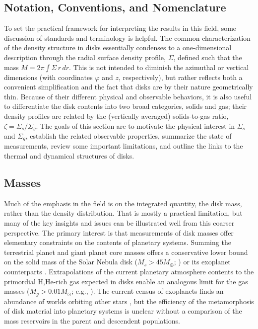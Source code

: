 \documentclass[a4paper]{ar-1col}
\begin{document}
\begin{textbox}[t]\section{Notation, Conventions, and Nomenclature}
To set the practical framework for interpreting the results in this field, some discussion of standards and terminology is helpful.  The common characterization of the density structure in disks essentially condenses to a one-dimensional description through the radial surface density profile, $\Sigma$, defined such that the mass $M = 2\pi \int \Sigma \, r \, dr$.  This is not intended to diminish the azimuthal or vertical dimensions (with coordinates $\varphi$ and $z$, respectively), but rather reflects both a convenient simplification and the fact that disks are by their nature geometrically thin.  Because of their different physical and observable behaviors, it is also useful to differentiate the disk contents into two broad categories, solids and gas; their density profiles are related by the (vertically averaged) solids-to-gas ratio, $\zeta = \Sigma_s / \Sigma_g$.  The goals of this section are to motivate the physical interest in $\Sigma_s$ and $\Sigma_g$, establish the related observable properties, summarize the state of measurements, review some important limitations, and outline the links to the thermal and dynamical structures of disks.  
\end{textbox}



\subsection{Masses} \label{sec:mass}

Much of the emphasis in the field is on the integrated quantity, the disk mass, rather than the density distribution.  That is mostly a practical limitation, but many of the key insights and issues can be illustrated well from this coarser perspective.  The primary interest is that measurements of disk masses offer elementary constraints on the contents of planetary systems.  Summing the terrestrial planet and giant planet core masses offers a conservative lower bound on the solid mass of the Solar Nebula disk ($M_s > 45 M_\oplus$; \citealt{weidenschilling77}) or its exoplanet counterparts \citep[e.g.,][]{chiang13}.  Extrapolations of the current planetary atmosphere contents to the primordial H,He-rich gas expected in disks \citep[e.g.,][]{kusaka70} enable an analogous limit for the gas masses ($M_g > 0.01 M_\odot$; e.g., \citealt{hayashi81}).  The current census of exoplanets finds an abundance of worlds orbiting other stars \citep{howard10,dressing13}, but the efficiency of the metamorphosis of disk material into planetary systems is unclear without a comparison of the mass reservoirs in the parent and descendent populations.          
\end{document}
